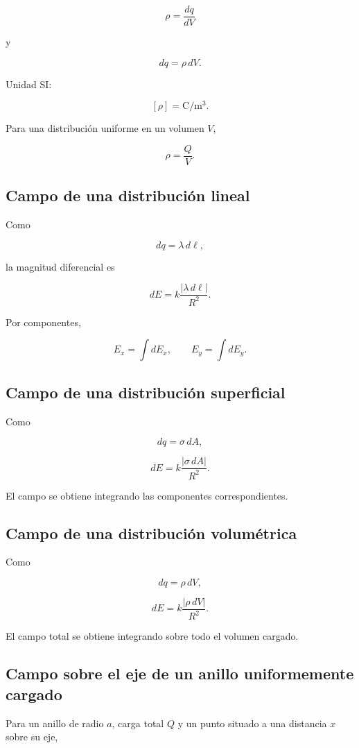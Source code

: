 \[
\boxed{\rho=\frac{dq}{dV}}
\]

y

\[
\boxed{dq=\rho\,dV}.
\]

Unidad SI:

\[
\boxed{[\rho]=\si{\coulomb\per\metre\cubed}}.
\]

Para una distribución uniforme en un volumen \(V\),

\[
\boxed{\rho=\frac{Q}{V}}.
\]


\subsection{Campo de una distribución lineal}

Como

\[
dq=\lambda\,d\ell,
\]

la magnitud diferencial es

\[
\boxed{dE=k\frac{|\lambda\,d\ell|}{R^2}}.
\]

Por componentes,

\[
\boxed{E_x=\int dE_x},
\qquad
\boxed{E_y=\int dE_y}.
\]


\subsection{Campo de una distribución superficial}

Como

\[
dq=\sigma\,dA,
\]

\[
\boxed{dE=k\frac{|\sigma\,dA|}{R^2}}.
\]

El campo se obtiene integrando las componentes correspondientes.


\subsection{Campo de una distribución volumétrica}

Como

\[
dq=\rho\,dV,
\]

\[
\boxed{dE=k\frac{|\rho\,dV|}{R^2}}.
\]

El campo total se obtiene integrando sobre todo el volumen cargado.


\subsection{Campo sobre el eje de un anillo uniformemente cargado}

Para un anillo de radio \(a\), carga total \(Q\) y un punto situado a una distancia \(x\) sobre su eje,

